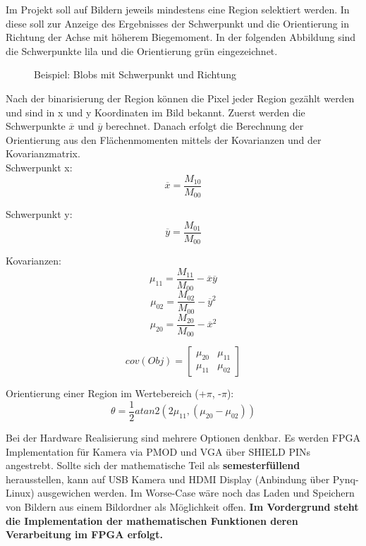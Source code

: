 \documentclass[a4paper]{report}
\begin{document}
Im Projekt soll auf Bildern jeweils mindestens eine Region selektiert werden. In diese soll zur Anzeige des Ergebnisses der Schwerpunkt und die Orientierung in Richtung der Achse mit höherem Biegemoment. In der folgenden Abbildung sind die Schwerpunkte lila und die Orientierung grün eingezeichnet.
	
	\begin{figure}[H]
	\centering
	\caption{Beispiel: Blobs mit Schwerpunkt und Richtung}
	\label{Entwurf des Projects}
	\end{figure}
	
Nach der binarisierung der Region können die Pixel jeder Region gezählt werden und sind in x und y Koordinaten im Bild bekannt. Zuerst werden die Schwerpunkte $\overline{x}$ und $\overline{y}$ berechnet. Danach erfolgt die Berechnung der Orientierung aus den Flächenmomenten mittels der Kovarianzen und der Kovarianzmatrix. \\

Schwerpunkt x: $$\overline{x} = \frac{M_{10}}{M_{00}}$$

Schwerpunkt y: $$\overline{y} = \frac{M_{01}}{M_{00}}$$

Kovarianzen: $$\mu_{11} = \frac{M_{11}}{M_{00}} - \overline{x}\overline{y} $$
			 $$\mu_{02} = \frac{M_{02}}{M_{00}} - \overline{y}^2 $$
			 $$\mu_{20} = \frac{M_{20}}{M_{00}} - \overline{x}^2 $$

     		$$cov(Obj) =\begin{bmatrix}
			 			\mu_{20} & \mu_{11}\\ 
				 		\mu_{11}& \mu_{02}
					 	\end{bmatrix}$$
			
			 
Orientierung einer Region im Wertebereich (+$\pi$, -$\pi$): $$ \theta = \frac{1}{2} atan2(2\mu_{11}, (\mu_{20}-\mu_{02}))    $$

Bei der Hardware Realisierung sind mehrere Optionen denkbar. Es werden FPGA Implementation für Kamera via PMOD und VGA über SHIELD PINs angestrebt. Sollte sich der mathematische Teil als \textbf{semesterfüllend} herausstellen, kann auf USB Kamera und HDMI Display (Anbindung über Pynq-Linux) ausgewichen werden. Im Worse-Case wäre noch das Laden und Speichern von Bildern aus einem Bildordner als Möglichkeit offen. \textbf{Im Vordergrund steht die Implementation der mathematischen Funktionen deren Verarbeitung im FPGA erfolgt.}
\end{document}

